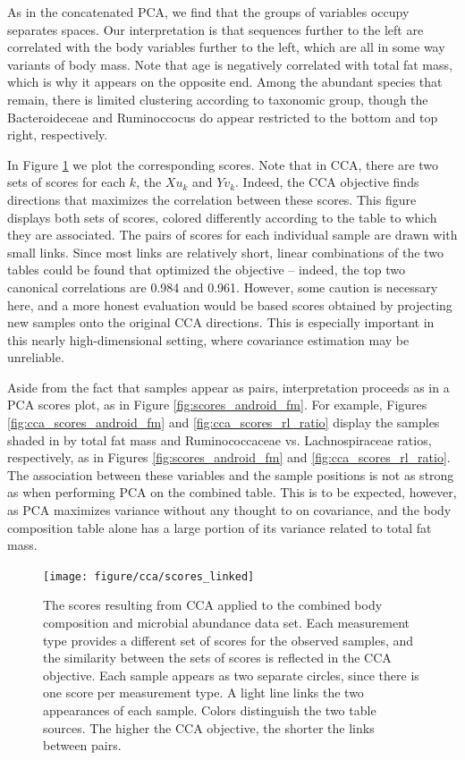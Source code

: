 \documentclass[14pt]{extarticle}
\begin{document}
As in the concatenated PCA, we find that the groups of variables occupy
separates spaces. Our interpretation is that sequences further to the left are
correlated with the body variables further to the left, which are all in some
way variants of body mass. Note that age is negatively correlated with total fat
mass, which is why it appears on the opposite end. Among the abundant species
that remain, there is limited clustering according to taxonomic group, though
the Bacteroideceae and Ruminoccocus do appear restricted to the bottom and top
right, respectively.

In Figure \ref{fig:cca_scores_linked} we plot the corresponding scores. Note
that in CCA, there are two sets of scores for each $k$, the $Xu_{k}$ and
$Yv_{k}$. Indeed, the CCA objective finds directions that maximizes the
correlation between these scores. This figure displays both sets of scores,
colored differently according to the table to which they are associated. The
pairs of scores for each individual sample are drawn with small links. Since
most links are relatively short, linear combinations of the two tables could be
found that optimized the objective -- indeed, the top two canonical correlations
are 0.984 and 0.961. However, some caution is necessary here, and a more honest
evaluation would be based scores obtained by projecting new samples onto the
original CCA directions. This is especially important in this nearly
high-dimensional setting, where covariance estimation may be unreliable.

Aside from the fact that samples appear as pairs, interpretation proceeds as in
a PCA scores plot, as in Figure \ref{fig:scores_android_fm}. For example, Figures
\ref{fig:cca_scores_android_fm} and \ref{fig:cca_scores_rl_ratio} display the
samples shaded in by total fat mass and Ruminococcaceae vs. Lachnospiraceae
ratios, respectively, as in Figures \ref{fig:scores_android_fm} and
\ref{fig:cca_scores_rl_ratio}. The association between these variables and the
sample positions is not as strong as when performing PCA on the combined table.
This is to be expected, however, as PCA maximizes variance without any thought
to on covariance, and the body composition table alone has a large portion of
its variance related to total fat mass.

\begin{figure}
  \centering
  \texttt{[image: figure/cca/scores\_linked]}
  \caption{The scores resulting from CCA applied to the combined body
    composition and microbial abundance data set. Each measurement type provides
    a different set of scores for the observed samples, and the similarity
    between the sets of scores is reflected in the CCA objective. Each sample
    appears as two separate circles, since there is one score per measurement
    type. A light line links the two appearances of each sample. Colors
    distinguish the two table sources. The higher the CCA objective, the shorter
    the links between pairs.
    \label{fig:cca_scores_linked}}
\end{figure}
\end{document}
